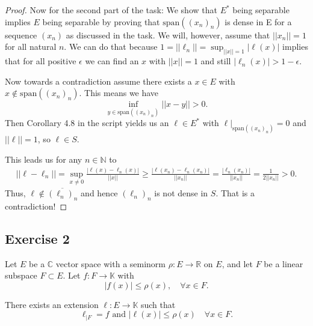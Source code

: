 \documentclass[a4paper]{article}
\newcommand{\N}{\mathbb{N}} %
\begin{document}
\begin{proof}
Now for the second part of the task: We show that $E^*$ being separable implies $E$ being separable by proving that $\mathrm{span}((x_n)_n)$ is dense in E for a sequence $(x_n)$ as discussed in the task. We will, however, assume that $||x_n|| = 1$ for all natural $n$. We can do that because $1 = ||\ell_n|| = \sup_{||x|| = 1} |\ell(x)|$ implies that for all positive $\epsilon$ we can find an $x$ with $||x|| = 1$ and still $|\ell_n(x)| > 1-\epsilon$.

Now towards a contradiction assume there exists a $x\in E$ with $x\notin \mathrm{span}((x_n)_n)$. This means we have
\[
    \inf_{y\in\mathrm{span}((x_n)_n)} ||x-y|| > 0.
\]
Then Corollary 4.8 in the script yields us an $\ell\in E^*$ with $\ell|_{\mathrm{span}((x_n)_n)} = 0$ and $||\ell|| = 1$, so $\ell\in S$.

This leads us for any $n\in\N$ to
\begin{align*}
    ||\ell - \ell_n|| = \sup_{x\neq 0}\frac{|\ell(x)-\ell_n(x)|}{||x||} \geq \frac{|\ell(x_n)-\ell_n(x_n)|}{||x_n||} = \frac{|\ell_n(x_n)|}{||x_n||} = \frac{1}{2||x_n||} > 0.
\end{align*}
Thus, $\ell \notin \overline{(\ell_n)_n}$ and hence $(\ell_n)_n$ is not dense in $S$. That is a contradiction!

\end{proof}


\subsection*{Exercise 2}
Let $E$ be a $\mathbb C$ vector space with a seminorm $\rho: E \to \mathbb R$ on $E$, and let $F$ be a linear subspace $F \subset E$. Let $f: F \to \mathbb K$ with
\[
    |f(x) | \leq \rho(x), \quad \forall x \in F.
\]
\begin{issue}{}{}
There exists an extension $\ell: E \to \mathbb K$ such that
\[
    \ell_{|F} = f\text{ and } |\ell(x)| \leq \rho(x) \quad \forall x \in F.
\]
\end{issue}
\end{document}
